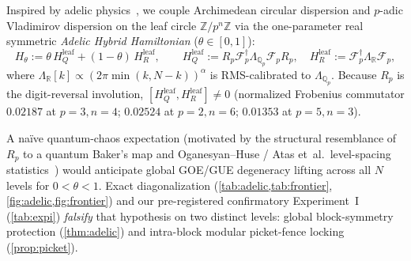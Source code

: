 \documentclass[11pt,a4paper]{article}
\numberwithin{equation}{section}
\theoremstyle{plain}
\theoremstyle{definition}
\theoremstyle{remark}
\newcommand{\Z}{\mathbb{Z}}
\newcommand{\R}{\mathbb{R}}
\newcommand{\Qp}{\mathbb{Q}_p}
\begin{document}
Inspired by adelic physics~\cite{FreundWitten1987,Dragovich2017}, we couple Archimedean circular dispersion and $p$-adic Vladimirov dispersion on the leaf circle $\Z / p^n\Z$ via the one-parameter real symmetric \emph{Adelic Hybrid Hamiltonian} ($\theta \in [0,1]$):
\begin{equation}
  H_\theta := \theta \, H_Q^{\mathrm{leaf}} + (1 - \theta) \, H_R^{\mathrm{leaf}}, \qquad
  H_Q^{\mathrm{leaf}} := R_p \mathcal{F}_p^\dagger \Lambda_{\Qp} \mathcal{F}_p R_p, \quad
  H_R^{\mathrm{leaf}} := \mathcal{F}_p^\dagger \Lambda_{\R} \mathcal{F}_p,
  \label{eq:adelic-ham}
\end{equation}
where $\Lambda_{\R}[k] \propto (2\pi \min(k, N-k))^\alpha$ is RMS-calibrated to $\Lambda_{\Qp}$. Because $R_p$ is the digit-reversal involution, $[H_Q^{\mathrm{leaf}}, H_R^{\mathrm{leaf}}] \ne 0$ (normalized Frobenius commutator $0.02187$ at $p=3, n=4$; $0.02524$ at $p=2, n=6$; $0.01353$ at $p=5, n=3$).

A na\"ive quantum-chaos expectation (motivated by the structural resemblance of $R_p$ to a quantum Baker's map and Oganesyan--Huse / Atas et~al.\ level-spacing statistics~\cite{OganesyanHuse2007,Atas2013}) would anticipate global GOE/GUE degeneracy lifting across all $N$ levels for $0 < \theta < 1$. Exact diagonalization (\cref{tab:adelic,tab:frontier}, \cref{fig:adelic,fig:frontier}) and our pre-registered confirmatory Experiment~I (\cref{tab:expi}) \emph{falsify} that hypothesis on two distinct levels: global block-symmetry protection (\cref{thm:adelic}) and intra-block modular picket-fence locking (\cref{prop:picket}).
\end{document}

